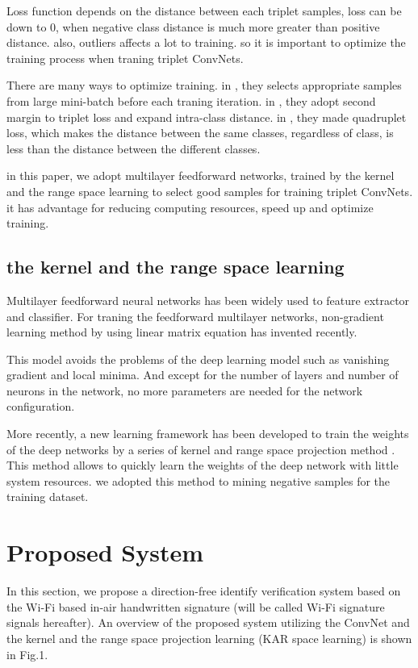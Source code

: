 \documentclass[runningheads]{llncs}
\begin{document}
Loss function depends on the distance between each triplet samples, loss can be down to 0, when negative class distance is much more greater than positive distance. also, outliers affects a lot to training.
so it is important to optimize the training process when traning triplet ConvNets.

There are many ways to optimize training. in \cite{schroff2015facenet}, they selects appropriate samples from large mini-batch before each traning iteration.
in \cite{cheng2016person}, they adopt second margin to triplet loss and expand intra-class distance.
in \cite{chen2017beyond}, they made quadruplet loss, which makes the distance between the same classes, 
regardless of class, is less than the distance between the different classes. 

in this paper, we adopt multilayer feedforward networks, trained by the kernel and the range space learning to select good samples for training triplet ConvNets.
it has advantage for reducing computing resources, speed up and optimize training.

\subsection{the kernel and the range space learning}

Multilayer feedforward neural networks has been widely used to feature extractor and classifier.
For traning the feedforward multilayer networks, non-gradient learning method by using linear matrix equation has invented recently. \cite{wang2018review}

This model avoids the problems of the deep learning model such as vanishing gradient and local minima. And except for the number of layers and number of neurons in the network, no more parameters are needed for the network configuration.

More recently, a new learning framework has been developed to train the weights of the deep networks by a series of kernel and range space projection method \cite{toh2018learning,toh2018gradient}.
This method allows to quickly learn the weights of the deep network with little system resources.
we adopted this method to mining negative samples for the training dataset.

\section{Proposed System}

In this section, we propose a direction-free identify verification system based on the Wi-Fi based in-air handwritten signature (will be called Wi-Fi signature signals hereafter). An overview of the proposed system utilizing the ConvNet \cite{lecun1998gradient} and the kernel and the range space projection learning (KAR space learning) \cite{toh2018learning,toh2018gradient} is shown in Fig.1.
\end{document}
